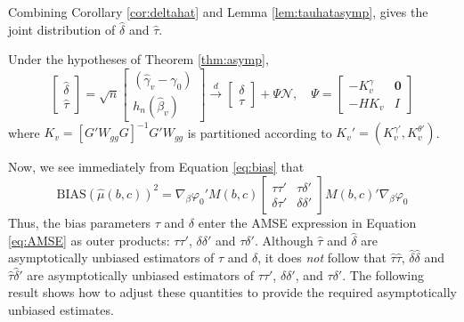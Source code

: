 Combining Corollary \ref{cor:deltahat} and Lemma \ref{lem:tauhatasymp}, gives the joint distribution of $\widehat{\delta}$ and $\widehat{\tau}$.

\begin{thm}
\label{thm:jointbias}
Under the hypotheses of Theorem \ref{thm:asymp},
	\[\left[\begin{array}{c}\widehat{\delta}\\ \widehat{\tau}\end{array}\right] = \sqrt{n}\left[\begin{array}{c}\left(\widehat{\gamma}_v-\gamma_0\right)\\h_n(\widehat{\beta}_v)\end{array}\right]
  \overset{d}{\rightarrow} \left[\begin{array}{c}\delta\\ \tau\end{array} \right] +\Psi \mathscr{N}, \quad
  \Psi = \left[\begin{array}{cc} -K_{v}^\gamma&\mathbf{0} \\ -HK_v&I\end{array}\right]
\]
	where $K_v = \left[G'W_{gg}G\right]^{-1}G'W_{gg}$  is partitioned according to $K_v' = (K_v^{\gamma '}, K_v^{\theta '})$.
\end{thm}
Now, we see immediately from Equation \ref{eq:bias} that
$$\mbox{BIAS}\left(\widehat{\mu}\left(b,c\right)\right)^2 = \nabla_\beta \varphi_0' M(b,c) \left[\begin{array}{cc}  \tau \tau'& \tau \delta'\\ \delta \tau'& \delta \delta'\end{array}\right] M(b,c)' \nabla_\beta \varphi_0$$
Thus, the bias parameters $\tau$ and $\delta$ enter the AMSE expression in Equation \ref{eq:AMSE} as outer products: $\tau\tau'$, $\delta\delta'$ and $\tau\delta'$.
Although $\widehat{\tau}$ and $\widehat{\delta}$ are asymptotically unbiased estimators of $\tau$ and $\delta$, it does \emph{not} follow that $\widehat{\tau}\widehat{\tau}$, $\widehat{\delta}\widehat{\delta}$ and $\widehat{\tau}\widehat{\delta}'$ are  asymptotically unbiased estimators of $\tau\tau'$, $\delta\delta'$, and $\tau\delta'$. 
The following result shows how to adjust these quantities to provide the required asymptotically unbiased estimates. 

